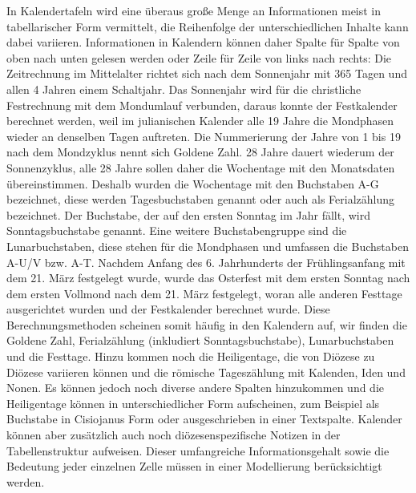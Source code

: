 \documentclass{article}
\begin{document}
    In Kalendertafeln wird eine überaus große Menge an Informationen meist in
                  tabellarischer Form vermittelt, die Reihenfolge der unterschiedlichen Inhalte kann
                  dabei variieren. Informationen in Kalendern können daher Spalte für Spalte von
                  oben nach unten gelesen werden oder Zeile für Zeile von links nach rechts: Die
                  Zeitrechnung im Mittelalter richtet sich nach dem Sonnenjahr mit 365 Tagen und
                  allen 4 Jahren einem Schaltjahr. Das Sonnenjahr wird für die christliche
                  Festrechnung mit dem Mondumlauf verbunden, daraus konnte der Festkalender
                  berechnet werden, weil im julianischen Kalender alle 19 Jahre die Mondphasen
                  wieder an denselben Tagen auftreten. Die Nummerierung der Jahre von 1 bis 19 nach
                  dem Mondzyklus nennt sich Goldene Zahl. 28 Jahre dauert wiederum der Sonnenzyklus,
                  alle 28 Jahre sollen daher die Wochentage mit den Monatsdaten übereinstimmen.
                  Deshalb wurden die Wochentage mit den Buchstaben A-G bezeichnet, diese werden
                  Tagesbuchstaben genannt oder auch als Ferialzählung bezeichnet. Der Buchstabe, der
                  auf den ersten Sonntag im Jahr fällt, wird Sonntagsbuchstabe genannt. Eine weitere
                  Buchstabengruppe sind die Lunarbuchstaben, diese stehen für die Mondphasen und
                  umfassen die Buchstaben A-U/V bzw. A-T. Nachdem Anfang des 6. Jahrhunderts der
                  Frühlingsanfang mit dem 21. März festgelegt wurde, wurde das Osterfest mit dem
                  ersten Sonntag nach dem ersten Vollmond nach dem 21. März festgelegt, woran alle
                  anderen Festtage ausgerichtet wurden und der Festkalender berechnet wurde. Diese
                  Berechnungsmethoden scheinen somit häufig in den Kalendern auf, wir finden die
                  Goldene Zahl, Ferialzählung (inkludiert Sonntagsbuchstabe), Lunarbuchstaben und
                  die Festtage. Hinzu kommen noch die Heiligentage, die von Diözese zu Diözese
                  variieren können und die römische Tageszählung mit Kalenden, Iden und Nonen. Es
                  können jedoch noch diverse andere Spalten hinzukommen und die Heiligentage können
                  in unterschiedlicher Form aufscheinen, zum Beispiel als Buchstabe in Cisiojanus
                  Form oder ausgeschrieben in einer Textspalte. Kalender können aber zusätzlich auch
                  noch diözesenspezifische Notizen in der Tabellenstruktur aufweisen. Dieser
                  umfangreiche Informationsgehalt sowie die Bedeutung jeder einzelnen Zelle müssen
                  in einer Modellierung berücksichtigt werden.\\
            
\end{document}
